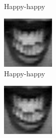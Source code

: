 \begin{figure}[H]
\begin{subfigure}[b]{0.15\textwidth}
		\caption{Happy-happy}
		\label{fig:timeseriesHappy:k}
	\end{subfigure}
	\begin{subfigure}[b]{0.15\textwidth}
		\includegraphics[width=\textwidth]{./img/timeseriesHappy/S026_006_00000012.png}
		\caption{Happy-happy}
		\label{fig:timeseriesHappy:l}
	\end{subfigure}
	\begin{subfigure}[b]{0.15\textwidth}
		\includegraphics[width=\textwidth]{./img/timeseriesHappy/S026_006_00000013.png}

\end{subfigure}
\end{figure}
